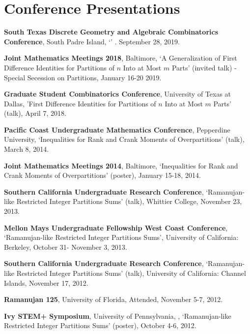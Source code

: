 \documentclass[letterpaper]{article}
\renewenvironment{itemize}{
  \begin{list}{}{
    \setlength{\leftmargin}{0em}
  }
}{
  \end{list}
}
\begin{document}
\section*{{\bf Conference Presentations}} 
\begin{itemize}
\item \textbf{South Texas Discrete Geometry and Algebraic Combinatorics Conference}, South Padre Island, `' . September 28, 2019. 
\item \textbf{Joint Mathematics Meetings 2018}, Baltimore, `A Generalization of First Difference Identities for Partitions of $n$ Into at Most $m$ Parts' (invited talk) - Special Secession on Partitions, January 16-20 2019. 
\item \textbf{Graduate Student Combinatorics Conference}, University of Texas at Dallas, 'First Difference Identities for Partitions of $n$ Into at Most $m$ Parts' (talk),  April 7, 2018.
\item \textbf{Pacific Coast Undergraduate Mathematics Conference}, Pepperdine University, `Inequalities for Rank and Crank Moments of Overpartitions' (talk), March 8, 2014.
\item \textbf{Joint Mathematics Meetings 2014}, Baltimore, `Inequalities for Rank and Crank Moments of Overpartitions' (poster), January 15-18, 2014.
\item \textbf{Southern California Undergraduate Research Conference}, `Ramanujan-like Restricted Integer Partitions Sums' (talk),  Whittier College, November 23, 2013.
\item \textbf{Mellon Mays Undergraduate Fellowship West Coast Conference}, `Ramanujan-like Restricted Integer Partitions Sums',  University of California: Berkeley, October 31- November 3, 2013.
\item \textbf{Southern California Undergraduate Research Conference}, `Ramanujan-like Restricted Integer Partitions Sums' (talk), University of California: Channel Islands, November 17, 2012.
\item \textbf{Ramanujan 125}, University of Florida, Attended, November 5-7, 2012.
\item \textbf{Ivy STEM+ Symposium}, University of Pennsylvania, , `Ramanujan-like Restricted Integer Partitions Sums' (poster), October 4-6, 2012.
\end{itemize}
\end{document}
